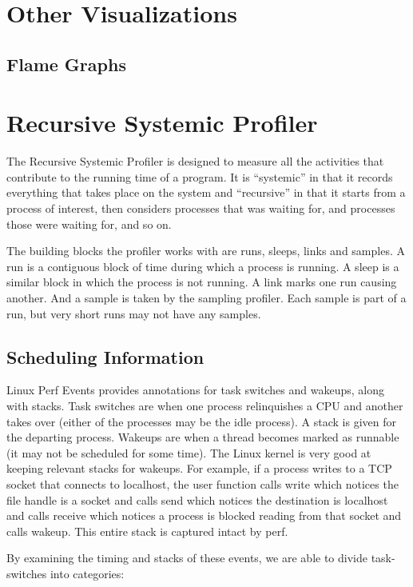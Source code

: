 \documentclass[10pt]{article}
\begin{document}
\section{Other Visualizations}

\subsection{Flame Graphs}

\section{Recursive Systemic Profiler}

The Recursive Systemic Profiler is designed to measure all the activities that contribute to the running time of a program.  It is ``systemic'' in that it records everything that takes place on the system and ``recursive'' in that it starts from a process of interest, then considers processes that was waiting for, and processes those were waiting for, and so on.

The building blocks the profiler works with are runs, sleeps, links and samples.  A run is a contiguous block of time during which a process is running.  A sleep is a similar block in which the process is not running.  A link marks one run causing another.  And a sample is taken by the sampling profiler.  Each sample is part of a run, but very short runs may not have any samples.

\subsection{Scheduling Information}

Linux Perf Events provides annotations for task switches and wakeups, along with stacks.  Task switches are when one process relinquishes a CPU and another takes over (either of the processes may be the idle process).  A stack is given for the departing process.  Wakeups are when a thread becomes marked as runnable (it may not be scheduled for some time).  The Linux kernel is very good at keeping relevant stacks for wakeups.  For example, if a process writes to a TCP socket that connects to localhost, the user function calls write which notices the file handle is a socket and calls send which notices the destination is localhost and calls receive which notices a process is blocked reading from that socket and calls wakeup.  This entire stack is captured intact by perf.

By examining the timing and stacks of these events, we are able to divide task-switches into categories:
\end{document}
